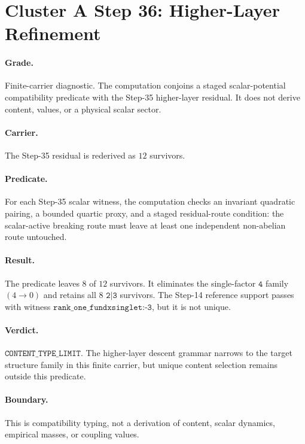 \section*{Cluster A Step 36: Higher-Layer Refinement}

\paragraph{Grade.}
Finite-carrier diagnostic. The computation conjoins a staged scalar-potential compatibility predicate with the Step-35 higher-layer residual. It does not derive content, values, or a physical scalar sector.

\paragraph{Carrier.}
The Step-35 residual is rederived as \(12\) survivors.

\paragraph{Predicate.}
For each Step-35 scalar witness, the computation checks an invariant quadratic pairing, a bounded quartic proxy, and a staged residual-route condition: the scalar-active breaking route must leave at least one independent non-abelian route untouched.

\paragraph{Result.}
The predicate leaves \(8\) of \(12\) survivors. It eliminates the single-factor \(\texttt{4}\) family \((4 \to 0)\) and retains all \(8\) \(\texttt{2|3}\) survivors. The Step-14 reference support passes with witness \(\texttt{rank\_one\_fundxsinglet:-3}\), but it is not unique.

\paragraph{Verdict.}
\(\texttt{CONTENT\_TYPE\_LIMIT}\). The higher-layer descent grammar narrows to the target structure family in this finite carrier, but unique content selection remains outside this predicate.

\paragraph{Boundary.}
This is compatibility typing, not a derivation of content, scalar dynamics, empirical masses, or coupling values.
